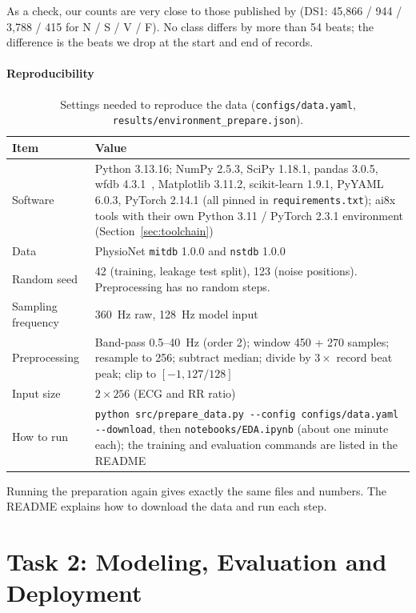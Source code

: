 \documentclass[11pt,a4paper]{article}
\newcommand{\code}[1]{\texttt{#1}}
\begin{document}
As a check, our counts are very close to those published by \citet{dechazal2004automatic} (DS1: 45,866 / 944 / 3,788 / 415 for N / S / V / F). No class differs by more than 54 beats; the difference is the beats we drop at the start and end of records.

\subsection{Reproducibility}

\begin{table}[H]
\centering
\small
\caption{Settings needed to reproduce the data (\code{configs/data.yaml}, \code{results/environment\_prepare.json}).}
\label{tab:repro}
\begin{tabularx}{\textwidth}{@{} l L @{}}
\toprule
Item & Value \\
\midrule
Software & Python 3.13.16; NumPy 2.5.3, SciPy 1.18.1, pandas 3.0.5, wfdb 4.3.1~\citep{wfdb_python}, Matplotlib 3.11.2, scikit-learn 1.9.1, PyYAML 6.0.3, PyTorch 2.14.1 (all pinned in \code{requirements.txt}); ai8x tools with their own Python 3.11 / PyTorch 2.3.1 environment (Section~\ref{sec:toolchain}) \\
Data & PhysioNet \code{mitdb} 1.0.0 and \code{nstdb} 1.0.0 \\
Random seed & 42 (training, leakage test split), 123 (noise positions). Preprocessing has no random steps. \\
Sampling frequency & 360~Hz raw, 128~Hz model input \\
Preprocessing & Band-pass 0.5--40~Hz (order 2); window 450 + 270 samples; resample to 256; subtract median; divide by $3 \times$ record beat peak; clip to $[-1, 127/128]$ \\
Input size & $2 \times 256$ (ECG and RR ratio) \\
How to run & \code{python src/prepare\_data.py -{}-config configs/data.yaml -{}-download}, then \code{notebooks/EDA.ipynb} (about one minute each); the training and evaluation commands are listed in the README \\
\bottomrule
\end{tabularx}
\end{table}

Running the preparation again gives exactly the same files and numbers. The README explains how to download the data and run each step.

\part*{Task 2: Modeling, Evaluation and Deployment}
\end{document}
